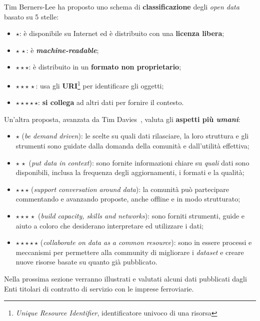 \documentclass[12pt,a4paper,italian]{report}
\begin{document}
Tim Berners-Lee ha proposto \cite{W3LinkedData} uno schema di
\textbf{classificazione} degli \textit{open data} basato su 5 stelle:
\begin{itemize}
    \item $\star$: è disponibile su Internet ed è distribuito con una
    \textbf{licenza libera};
    \item $\star\,\star$: è \textbf{\textit{machine-readable}};
    \item $\star \star \star$: è distribuito in un \textbf{formato non
        proprietario};
    \item $\star \star \star\,\star$: usa gli
    \textbf{URI}\footnote{\textit{Unique Resource Identifier},
        identificatore univoco di una risorsa} per identificare gli
    oggetti;
    \item $\star \star \star \star \star$: \textbf{si collega} ad
    altri dati per fornire il contesto.
\end{itemize}

Un'altra proposta, avanzata da Tim Davies~\cite{DaviesOpenData},
valuta gli \textbf{aspetti più \textit{umani}}:

\begin{itemize}
    \item $\star$ (\textit{be demand driven}): le scelte su quali dati
    rilasciare, la loro struttura e gli strumenti sono guidate dalla
    domanda della comunità e dall'utilità effettiva;
    \item $\star\,\star$ (\textit{put data in context}): sono fornite
    informazioni chiare su \textit{quali} dati sono disponibili,
    inclusa la frequenza degli aggiornamenti, i formati e la qualità;
    \item $\star \star \star$ (\textit{support conversation around
        data}): la comunità può partecipare commentando e avanzando
    proposte, anche offline e in modo strutturato;
    \item $\star \star \star\,\star$ (\textit{build capacity, skills
        and networks}): sono forniti strumenti, guide e aiuto a coloro
    che desiderano interpretare ed utilizzare i dati;
    \item $\star \star \star \star \star$ (\textit{collaborate on data
        as a common resource}): sono in essere processi e meccanismi
    per permettere alla community di migliorare i \textit{dataset} e
    creare nuove risorse basate su quanto già pubblicato.
\end{itemize}

Nella prossima sezione verranno illustrati e valutati alcuni dati
pubblicati dagli Enti titolari di contratto di servizio con le imprese
ferroviarie.
\end{document}
